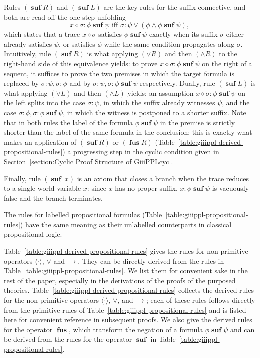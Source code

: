 \documentclass[manuscript,screen]{acmart}
\newcommand{\la}[0]{\langle}
\newcommand{\ra}[0]{\rangle}
\newcommand{\cat}[0]{\diamond}
\DeclareMathOperator{\osuf}{\mathbf{suf}}
\DeclareMathOperator{\ofus}{\mathbf{fus}}
\newcommand{\A}[1]{\mbox{ \textbf{#1} }}
\newcommand{\MO}{\A{MO}}
\newcommand{\EMO}{\A{EMO}}
\begin{document}
Rules $(\osuf R)$ and $(\osuf L)$ are the key rules for the suffix connective, and both are read off the one-step unfolding
$$
x\cat\sigma : \phi\osuf\psi \mbox{ iff }\sigma : \psi\vee (\phi\wedge \phi\osuf\psi), 
$$
which states that a trace $x\cat\sigma$ satisfies $\phi\osuf\psi$ exactly when its suffix $\sigma$ either already satisfies $\psi$, or satisfies $\phi$ while the same condition propagates along $\sigma$. 
Intuitively, rule $(\osuf R)$ is what applying $(\vee R)$ and then $(\wedge R)$ to the right-hand side of this equivalence yields: to prove $x\cat\sigma : \phi\osuf\psi$ on the right of a sequent, it suffices to prove the two premises in which the target formula is replaced by $\sigma : \psi, \sigma : \phi$ and by $\sigma : \psi, \sigma : \phi\osuf\psi$ respectively. 
Dually, rule $(\osuf L)$ is what applying $(\vee L)$ and then $(\wedge L)$ yields: an assumption $x\cat\sigma : \phi\osuf\psi$ on the left splits into the case $\sigma : \psi$, in which the suffix already witnesses $\psi$, and the case $\sigma : \phi, \sigma : \phi\osuf\psi$, in which the witness is postponed to a shorter suffix. 
Note that in both rules the label of the formula $\phi\osuf\psi$ in the premise is strictly shorter than the label of the same formula in the conclusion; this is exactly what makes an application of $(\osuf R)$ or $(\ofus R)$ (Table~\ref{table:giiippl-derived-propositional-rules}) a progressing step in the cyclic condition given in Section~\ref{section:Cyclic Proof Structure of GiiiPPLcyc}. 

Finally, rule $(\osuf\ x)$ is an axiom that closes a branch when the trace reduces to a single world variable $x$: since $x$ has no proper suffix, $x : \phi\osuf\psi$ is vacuously false and the branch terminates. 

The rules for labelled propositional formulas (Table~\ref{table:giiippl-propositional-rules}) have the same meaning as their unlabelled counterparts in classical propositional logic. 

\ifx
Table~\ref{table:giiippl-derived-propositional-rules} gives the rules for non-primitive operators $\la\cdot\ra$, $\vee$ and $\to$. They can be directly derived from the rules in Table~\ref{table:giiippl-propositional-rules}. 
We list them for convenient sake in the rest of the paper, especially in the derivations of the proofs of the purposed theories. 
\fi
Table~\ref{table:giiippl-derived-propositional-rules} collects the derived rules for the non-primitive operators $\la\cdot\ra$, $\vee$, and $\to$; each of these rules follows directly from the primitive rules of Table~\ref{table:giiippl-propositional-rules} and is listed here for convenient reference in subsequent proofs. 
We also give the derived rules for the operator $\ofus$, which transform the negation of a formula $\phi\osuf \psi$ and can be derived from the rules for the operator $\osuf$ in Table~\ref{table:giiippl-propositional-rules}. 
\end{document}

